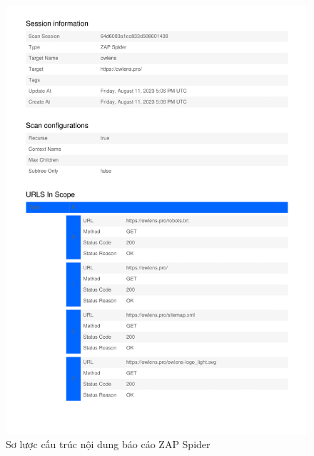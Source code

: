 \begin{figure}[H]
      \centering
      \includegraphics[width=\textwidth]{applied-thesis-chapters/chapter-6/Sơ lược cấu trúc nội dung báo cáo ZAP Spider.png}
      \caption{Sơ lược cấu trúc nội dung báo cáo ZAP Spider}
      \label{fig:SoLuocCauTrucNoiDungBaoCaoZapSpider}
\end{figure}

